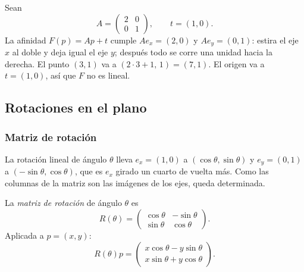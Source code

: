 \begin{ejemplo}
Sean
\[
A=\begin{pmatrix}2&0\\0&1\end{pmatrix},\qquad t=(1,0).
\]
La afinidad \(F(p)=Ap+t\) cumple \(Ae_x=(2,0)\) y \(Ae_y=(0,1)\): estira el eje \(x\) al doble y deja igual el eje
\(y\); después todo se corre una unidad hacia la derecha. El punto \((3,1)\) va a
\((2\cdot3+1,\,1)=(7,1)\). El origen va a \(t=(1,0)\), así que \(F\) no es lineal.
\end{ejemplo}

\subsection{Rotaciones en el plano}\label{sec:rot-plano}

{\small\vspace{1mm}\par}
{\small\vspace{1mm}\par}


\subsubsection{Matriz de rotación}

La rotación lineal de ángulo \(\theta\) lleva \(e_x=(1,0)\) a \((\cos\theta,\sin\theta)\) y
\(e_y=(0,1)\) a \((-\sin\theta,\cos\theta)\), que es \(e_x\) girado un cuarto de vuelta más.
Como las columnas de la matriz son las imágenes de los ejes, queda determinada.

\begin{definicion}
La \emph{matriz de rotación} de ángulo \(\theta\) es
\[
  R(\theta)=
  \begin{pmatrix}
    \cos\theta&-\sin\theta\\
    \sin\theta& \cos\theta
  \end{pmatrix}.
\]
Aplicada a \(p=(x,y)\):
\[
  R(\theta)p=
  \begin{pmatrix}
    x\cos\theta-y\sin\theta\\
    x\sin\theta+y\cos\theta
  \end{pmatrix}.
\]
\end{definicion}

